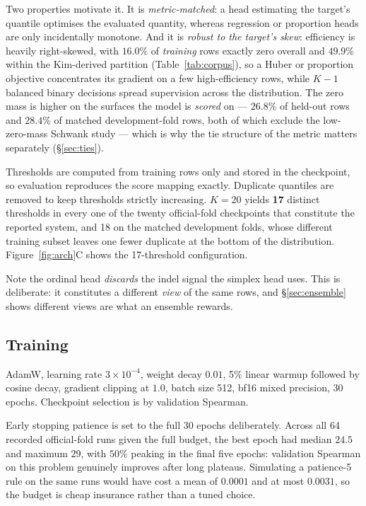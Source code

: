 \documentclass[11pt]{article}
\begin{document}
Two properties motivate it. It is \emph{metric-matched}: a head estimating the target's
quantile optimises the evaluated quantity, whereas regression or proportion heads are
only incidentally monotone. And it is \emph{robust to the target's skew}: efficiency is
heavily right-skewed, with $16.0\%$ of \emph{training} rows exactly zero overall and
$49.9\%$ within the Kim-derived partition (Table~\ref{tab:corpus}), so a Huber or
proportion objective concentrates its gradient on a few high-efficiency rows, while
$K-1$ balanced binary decisions spread supervision across the distribution. The zero
mass is higher on the surfaces the model is \emph{scored} on --- $26.8\%$ of held-out
rows and $28.4\%$ of matched development-fold rows, both of which exclude the
low-zero-mass Schwank study --- which is why the tie structure of the metric matters
separately (\S\ref{sec:ties}).

Thresholds are computed from training rows only and stored in the checkpoint, so
evaluation reproduces the score mapping exactly. Duplicate quantiles are removed to
keep thresholds strictly increasing. $K=20$ yields \textbf{17} distinct thresholds in
every one of the twenty official-fold checkpoints that constitute the reported system,
and 18 on the matched development folds, whose different training subset leaves one
fewer duplicate at the bottom of the distribution. Figure~\ref{fig:arch}C shows the
17-threshold configuration.

Note the ordinal head \emph{discards} the indel signal the simplex head uses. This is
deliberate: it constitutes a different \emph{view} of the same rows, and
\S\ref{sec:ensemble} shows different views are what an ensemble rewards.

\subsection{Training}

AdamW, learning rate $3\times10^{-4}$, weight decay $0.01$, 5\% linear warmup followed
by cosine decay, gradient clipping at $1.0$, batch size 512, bf16 mixed precision, 30
epochs. Checkpoint selection is by validation Spearman.

Early stopping patience is set to the full 30 epochs deliberately. Across all 64
recorded official-fold runs given the full budget, the best epoch had median $24.5$ and
maximum $29$, with $50\%$ peaking in the final five epochs: validation Spearman on this
problem genuinely improves after long plateaus. Simulating a patience-5 rule on the same
runs would have cost a mean of $0.0001$ and at most $0.0031$, so the budget is cheap
insurance rather than a tuned choice.
\end{document}

